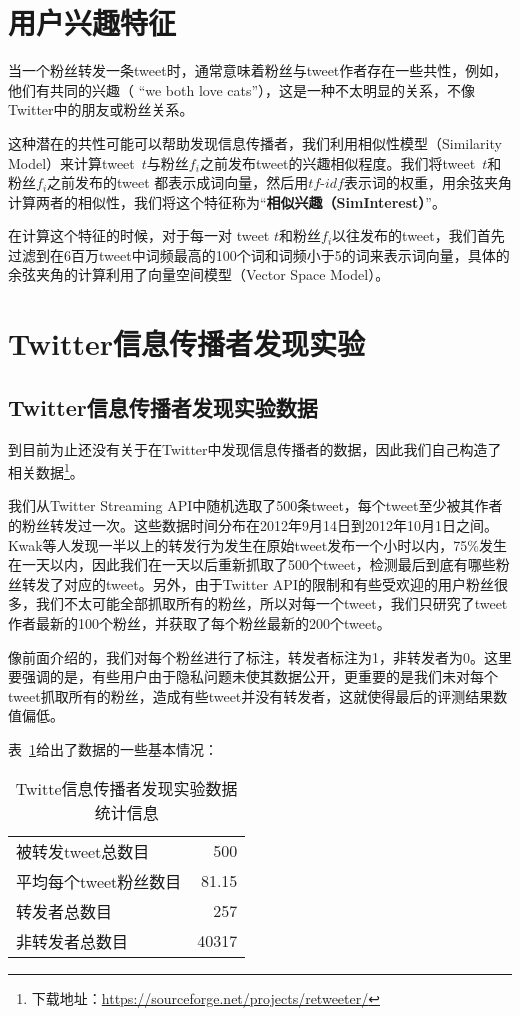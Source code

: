 \section{用户兴趣特征}
当一个粉丝转发一条tweet时，通常意味着粉丝与tweet作者存在一些共性，例如，他们有共同的兴趣（ ``we both love cats''），这是一种不太明显的关系，不像Twitter中的朋友或粉丝关系。

这种潜在的共性可能可以帮助发现信息传播者，我们利用相似性模型（Similarity Model）来计算tweet~$t$与粉丝$f_i$之前发布tweet的兴趣相似程度。我们将tweet~$t$和粉丝$f_i$之前发布的tweet
都表示成词向量，然后用$tf$-$idf$表示词的权重，用余弦夹角计算两者的相似性，我们将这个特征称为“\textbf{相似兴趣（SimInterest）}”。

在计算这个特征的时候，对于每一对 tweet $t$和粉丝$f_i$以往发布的tweet，我们首先过滤到在6百万tweet中词频最高的100个词和词频小于5的词来表示词向量，具体的余弦夹角的计算利用了向量空间模型（Vector Space Model）。

\section{Twitter信息传播者发现实验}

\subsection{Twitter信息传播者发现实验数据}
到目前为止还没有关于在Twitter中发现信息传播者的数据，因此我们自己构造了相关数据\footnote{下载地址：\url{https://sourceforge.net/projects/retweeter/}}。

我们从Twitter Streaming API中随机选取了500条tweet，每个tweet至少被其作者的粉丝转发过一次。这些数据时间分布在2012年9月14日到2012年10月1日之间。Kwak等人发现一半以上的转发行为发生在原始tweet发布一个小时以内，75\%发生在一天以内，因此我们在一天以后重新抓取了500个tweet，检测最后到底有哪些粉丝转发了对应的tweet。另外，由于Twitter API的限制和有些受欢迎的用户粉丝很多，我们不太可能全部抓取所有的粉丝，所以对每一个tweet，我们只研究了tweet作者最新的100个粉丝，并获取了每个粉丝最新的200个tweet。

像前面介绍的，我们对每个粉丝进行了标注，转发者标注为1，非转发者为0。这里要强调的是，有些用户由于隐私问题未使其数据公开，更重要的是我们未对每个tweet抓取所有的粉丝，造成有些tweet并没有转发者，这就使得最后的评测结果数值偏低。

表~\ref{Data_sigir_stat}给出了数据的一些基本情况：

 \begin{table}[htp]
\centering
\caption{Twitte信息传播者发现实验数据统计信息}
\label{Data_sigir_stat}
 \begin{tabular}{|l r|}
 \hline
被转发tweet总数目& 500 \\
平均每个tweet粉丝数目& 81.15 \\
转发者总数目 & 257 \\
非转发者总数目 & 40317 \\
 \hline
\end{tabular}
\end{table}

